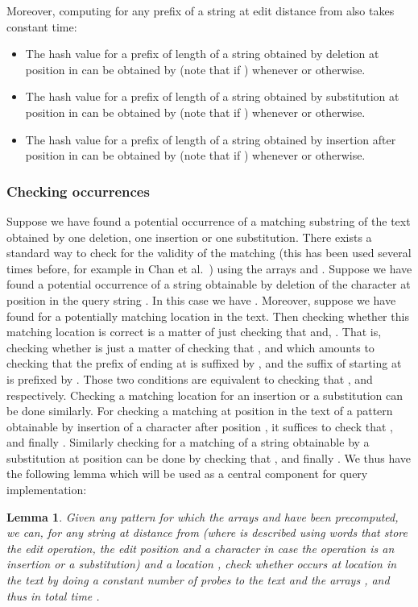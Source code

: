 \documentclass{article}
\newcommand{\?}{\mskip1.5mu}
\newtheorem{lemma}{Lemma}
\begin{document}
Moreover, computing  for any prefix  of a string  at edit distance  from  also takes constant time:
\begin{itemize}
\item The hash value for a prefix  of length  of a string  obtained by deletion at position  in  can be obtained by  (note that  if ) whenever  or  otherwise. 
\item The hash value for a prefix  of length  of a string  obtained by substitution at position  in  can be obtained by  (note that  if ) whenever  or  otherwise.
\item The hash value for a prefix  of length  of a string  obtained by insertion after position  in  can be obtained by  (note that  if ) whenever  or  otherwise. 
\end{itemize}
\subsubsection{Checking occurrences}
Suppose we have found a potential occurrence of a matching substring of the text obtained by one deletion, one insertion or one substitution. There exists a standard way to check for the validity of the matching (this has been used several times before, for example in Chan et al.~\cite{CLSTW10}) using the arrays  and . Suppose we have found a potential occurrence of a string  obtainable by deletion of the character at position  in the query string . In this case  we have . Moreover, suppose we have found for  a potentially matching location  in the text. Then checking whether this matching location is correct is a matter of just checking that  and, . That is, checking whether  is just a matter of checking that , and  which amounts to checking that the prefix of  ending at  is suffixed by , and the suffix of  starting at  is prefixed by . Those two conditions are equivalent to checking that , and  respectively. Checking a matching location for an insertion or a substitution can be done similarly. For checking a matching at position  in the text of a pattern obtainable by insertion of a character  after position , it suffices to check that ,  and finally . Similarly checking for a matching of a string obtainable by a substitution at position  can be done by checking that ,  and finally . 
We thus have the following lemma which will be used as a central component for query implementation:
\begin{lemma}
\label{check_occ_lemma}
Given any pattern  for which the arrays  and  have been precomputed, we can, for any string  at distance  from  (where  is described using  words that store the edit operation, the edit position and a character in case the operation is an insertion or a substitution) and a location , check whether  occurs at location  in the text by doing a constant number of probes to the text and the arrays ,   and thus in total time . 
\end{lemma}
\end{document}
